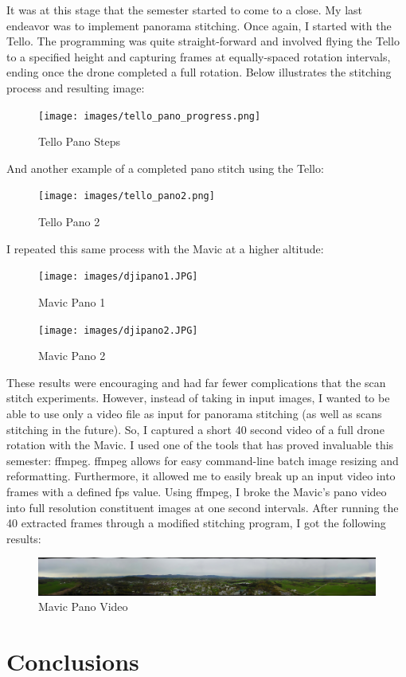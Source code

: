 It was at this stage that the semester started to come to a close. My last endeavor was to implement panorama stitching. Once again, I started with the Tello. The programming was quite straight-forward and involved flying the Tello to a specified height and capturing frames at equally-spaced rotation intervals, ending once the drone completed a full rotation. Below illustrates the stitching process and resulting image:

\begin{figure}[htbp]
\centering
\texttt{[image: images/tello\_pano\_progress.png]}
\caption{Tello Pano Steps}
\end{figure}

And another example of a completed pano stitch using the Tello:

\begin{figure}[htbp]
\centering
\texttt{[image: images/tello\_pano2.png]}
\caption{Tello Pano 2}
\end{figure}

I repeated this same process with the Mavic at a higher altitude:

\begin{figure}[htbp]
\centering
\texttt{[image: images/djipano1.JPG]}
\caption{Mavic Pano 1}
\end{figure}

\begin{figure}[htbp]
\centering
\texttt{[image: images/djipano2.JPG]}
\caption{Mavic Pano 2}
\end{figure}

These results were encouraging and had far fewer complications that the scan stitch experiments. However, instead of taking in input images, I wanted to be able to use only a video file as input for panorama stitching (as well as scans stitching in the future). So, I captured a short 40 second video of a full drone rotation with the Mavic. I used one of the tools that has proved invaluable this semester: ffmpeg. ffmpeg allows for easy command-line batch image resizing and reformatting. Furthermore, it allowed me to easily break up an input video into frames with a defined fps value. Using ffmpeg, I broke the Mavic's pano video into full resolution constituent images at one second intervals. After running the 40 extracted frames through a modified stitching program, I got the following results:

\begin{figure}[htbp]
\centering
\includegraphics[keepaspectratio,width=\textwidth,height=0.75\textheight]{images/djipanovideo.JPG}
\caption{Mavic Pano Video}
\end{figure}

\chapter{Conclusions}
\label{conclusions}